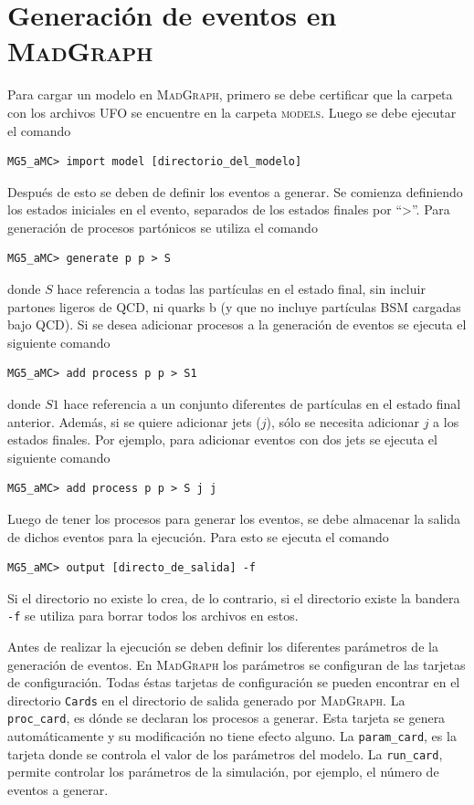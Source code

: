 \chapter{Generación de eventos en \textsc{MadGraph}}\label{GenMG}
Para cargar un modelo en \textsc{MadGraph}, primero se debe certificar que la carpeta con los archivos UFO se encuentre en la carpeta \textsc{models}. Luego se debe ejecutar el comando 
%
\begin{verbatim}
MG5_aMC> import model [directorio_del_modelo]
\end{verbatim}
%
Después de esto se deben de definir los eventos a generar. Se comienza definiendo los estados iniciales en el evento, separados de los estados finales por “\textgreater”. Para generación de procesos partónicos se utiliza el comando 
%
\begin{verbatim}
MG5_aMC> generate p p > S
\end{verbatim}
%
donde $S$ hace referencia a todas las partículas en el estado final, sin incluir partones ligeros de QCD, ni quarks b (y que no incluye partículas BSM cargadas bajo QCD). Si se desea adicionar procesos a la generación de eventos se ejecuta el siguiente comando
%
\begin{verbatim}
MG5_aMC> add process p p > S1
\end{verbatim}
%
donde $S1$ hace referencia a un conjunto diferentes de partículas en el estado final anterior.
Además, si se quiere adicionar jets ($j$), sólo se necesita adicionar $j$ a los estados finales. Por ejemplo, para adicionar eventos con dos jets se ejecuta el siguiente comando
%
\begin{verbatim}
MG5_aMC> add process p p > S j j
\end{verbatim}
%
Luego de tener los procesos para generar los eventos, se debe almacenar la salida de dichos eventos para la ejecución. Para esto se ejecuta el comando
%
\begin{verbatim}
MG5_aMC> output [directo_de_salida] -f
\end{verbatim}
%
Si el directorio no existe lo crea, de lo contrario, si el directorio existe la bandera \verb|-f| se utiliza para borrar todos los archivos en estos. 

Antes de realizar la ejecución se deben definir los diferentes parámetros de la generación de eventos. En \textsc{MadGraph} los parámetros se configuran de las tarjetas de configuración. Todas éstas tarjetas de configuración se pueden encontrar en el directorio \verb|Cards| en el directorio de salida generado por \textsc{MadGraph}. La \verb|proc_card|, es dónde se declaran los procesos a generar. Esta tarjeta se genera automáticamente y su modificación no tiene efecto alguno. La \verb|param_card|, es la tarjeta donde se controla el valor de los parámetros del modelo. La \verb|run_card|, permite controlar los parámetros de la simulación, por ejemplo, el número de eventos a generar.

